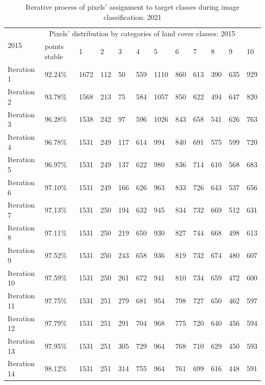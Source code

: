 \documentclass[jimaging,article,submit,pdftex,moreauthors]{Definitions/mdpi}
\begin{document}
\begin{table}[H]
  \centering
  \begin{tabularx}{\textwidth}{p{1.6cm}p{1.8cm}p{0.6cm}p{0.6cm}p{0.6cm}p{0.6cm}p{0.6cm}p{0.6cm}p{0.6cm}p{0.6cm}p{0.6cm}p{0.6cm}}
  \toprule
  \multirow{2}{*}{2015} & \multicolumn{10}{c}{Pixels' distribution by categories of land cover classes: 2015} \\
     & points stable & 1 & 2 &  3 & 4 & 5 & 6 & 7 & 8 & 9 & 10 \\
    \midrule
    Iteration 1 & 92.24\% & 1672 & 112 &  50 &559       &1110
        &860     &   613   &     390        &635     &   929 \\
    Iteration 2 & 93.78\% & 1568    &    213   &      75     &   584    &   1057&
        850   &     622       & 494   &     647     &   820 \\
    Iteration 3 & 96.28\% & 1538   &     242      &   97        &596     &  1026&
        843    &    658      &  541       & 626     &   763 \\
    Iteration 4 & 96.78\% &1531   &     249     &   117  &      614   &     994&
        840   &     691  &      575    &    599       & 720 \\
    Iteration 5 & 96.97\% & 1531   &     249    &    137    &    622      &  980&
        836    &    714 &       610   &     568      &  683 \\
    Iteration 6 & 97.10\% & 1531  &      249    &    166     &  626   &     963&
        833     &   726  &      643    &    537      &  656 \\
    Iteration 7 & 97.13\% & 1531    &    250    &    194   &     632    &    945&
        834    &    732    &    669     &   512    &    631 \\
    Iteration 8 & 97.11\% & 1531    &    250   &     219     &   650    &   930 &
        827  &      744   &     668    &    498     &   613 \\
    Iteration 9 & 97.52\% & 1531  &      250    &    243    &    658 &      936&
        819     &   732  &      674     &   480     &   607 \\
    Iteration 10 & 97.59\% & 1531   &     250    &    261    &    672   &     941&
        810     &   734    &    659   &     472  &      600 \\
    Iteration 11 & 97.75\% & 1531    &    251  &      279    &    681   &     954&
        798    &    727   &     650  &      462    &    597 \\
    Iteration 12 & 97.79\% & 1531   &     251   &     291   &     704    &    968&
        775   &     720     &   640   &     456     &   594\\
    Iteration 13 & 97.95\% & 1531 &       251   &     305    &    729   &     964 &
        768   &     710    &    629    &    450  &     593 \\
    Iteration 14 & 98.12\% & 1531   &     251    &    314     &   755 &     964&
        761   &     699   &     616    &    448   &     591 \\
\bottomrule
\end{tabularx}
  \caption{Iterative process of pixels' assignment to target classes during image classification: 2021}
  \label{tabB1}
\end{table}
\end{document}
